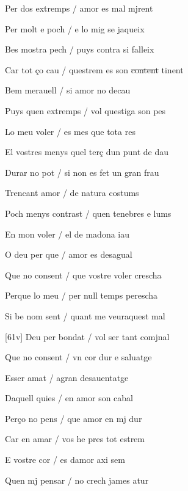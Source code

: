 \documentclass[12pt]{article}
\begin{document}
\begin{estrofa}

 Per dos extremps / amor es mal mjrent

 Per molt e poch / e lo mig se jaqueix

 Bes mostra pech / puys contra si falleix

 Car tot \c{c}o cau / questrem es son \sout{content} tinent

 Bem merauell / si amor no decau

 Puys quen extremps / vol questiga son pes

 Lo meu voler / es mes que tota res

 El vostres menys quel ter\c{c} dun punt de dau

\end{estrofa}



\begin{estrofa}

 Durar no pot / si non es fet un gran frau

 Trencant amor / de natura costums

 Poch menys contrast / quen tenebres e lums

 En mon voler / el de madona iau

 O deu per que / amor es desagual

 Que no consent / que vostre voler crescha

 Perque lo meu / per null temps perescha

 Si be nom sent / quant me veuraquest mal

\end{estrofa}



\begin{estrofa}

 [61v] Deu per bondat / vol ser tant comjnal

 Que no consent / vn cor dur e saluatge

 Esser amat / agran desauentatge

 Daquell quies / en amor son cabal

 Per\c{c}o no pens / que amor en mj dur

 Car en amar / vos he pres tot estrem

 E vostre cor / es damor axi sem

 Quen mj pensar / no crech james atur

\end{estrofa}
\end{document}
